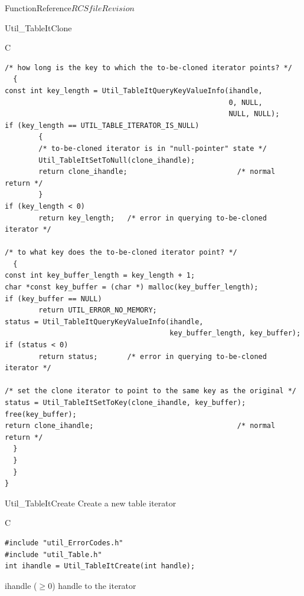 \begin{cactuspart}{FunctionReference}{$RCSfile$}{$Revision$}
\begin{FunctionDescription}{Util\_TableItClone}
\begin{ExampleSection}
\begin{Example}{C}
\begin{verbatim}
/* how long is the key to which the to-be-cloned iterator points? */
  {
const int key_length = Util_TableItQueryKeyValueInfo(ihandle,
                                                     0, NULL,
                                                     NULL, NULL);
if (key_length == UTIL_TABLE_ITERATOR_IS_NULL)
        {
        /* to-be-cloned iterator is in "null-pointer" state */
        Util_TableItSetToNull(clone_ihandle);
        return clone_ihandle;                          /* normal return */
        }
if (key_length < 0)
        return key_length;   /* error in querying to-be-cloned iterator */

/* to what key does the to-be-cloned iterator point? */
  {
const int key_buffer_length = key_length + 1;
char *const key_buffer = (char *) malloc(key_buffer_length);
if (key_buffer == NULL)
        return UTIL_ERROR_NO_MEMORY;
status = Util_TableItQueryKeyValueInfo(ihandle,
                                       key_buffer_length, key_buffer);
if (status < 0)
        return status;       /* error in querying to-be-cloned iterator */

/* set the clone iterator to point to the same key as the original */
status = Util_TableItSetToKey(clone_ihandle, key_buffer);
free(key_buffer);
return clone_ihandle;                                  /* normal return */
  }
  }
  }
}
\end{verbatim}
\end{Example}
\end{ExampleSection}
\end{FunctionDescription}


\begin{FunctionDescription}{Util\_TableItCreate}
\label{Util-TableItCreate}
Create a new table iterator

\begin{SynopsisSection}
\begin{Synopsis}{C}
\begin{verbatim}
#include "util_ErrorCodes.h"
#include "util_Table.h"
int ihandle = Util_TableItCreate(int handle);
\end{verbatim}
\end{Synopsis}
\end{SynopsisSection}

\begin{ResultSection}
\begin{Result}{ihandle ($\ge 0$)}
handle to the iterator
\end{Result}
\end{ResultSection}


\end{FunctionDescription}
\end{cactuspart}
